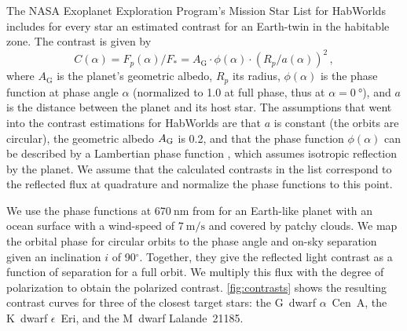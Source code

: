 \documentclass[usenatbib]{mnras}
\newcommand{\HWO}{HabWorlds\xspace}
\begin{document}
The NASA Exoplanet Exploration Program’s Mission Star List for \HWO includes for every star an estimated contrast for an Earth-twin in the habitable zone.
The contrast is given by \citep[see, e.g.,][]{2023A&A...671A.165M}
\begin{equation}
    C(\alpha) 
    = F_p(\alpha) / F_* 
    = A_\mathrm{G} \cdot \phi(\alpha) \cdot \left( R_p / a(\alpha) \right)^2 \,,
    \label{eq:contrast}
\end{equation}
where $A_\mathrm{G}$ is the planet's geometric albedo, $R_p$ its radius, $\phi(\alpha)$ is the phase function at phase angle $\alpha$ (normalized to \num{1.0} at full phase, thus at $\alpha=\qty{0}{\degree}$), and $a$ is the distance between the planet and its host star.
The assumptions that went into the contrast estimations for \HWO are that $a$ is constant (the orbits are circular), the geometric albedo $A_{\rm G}$ is \num{0.2}, and that the phase function $\phi(\alpha)$ can be described by a Lambertian phase function \citep{Russell1916}, which assumes isotropic reflection by the planet. 
We assume that the calculated contrasts in the list correspond to the reflected flux at quadrature and normalize the phase functions to this point.

We use the phase functions at $\qty{670}{\nano\meter}$ from \citet{treesandstam2019} for an Earth-like planet with an ocean surface with a wind-speed of $\qty{7}{\meter\per\second}$  and covered by patchy clouds. 
We map the orbital phase for circular orbits to the phase angle and on-sky separation given an inclination $i$ of 90$^\circ$. 
Together, they give the reflected light contrast as a function of separation for a full orbit.
We multiply this flux with the degree of polarization to obtain the polarized contrast.
\cref{fig:contrasts} shows the resulting contrast curves for three of the closest target stars: the G~dwarf $\alpha$~Cen~A, the K~dwarf $\epsilon$~Eri, and the M~dwarf Lalande~21185.
\end{document}
